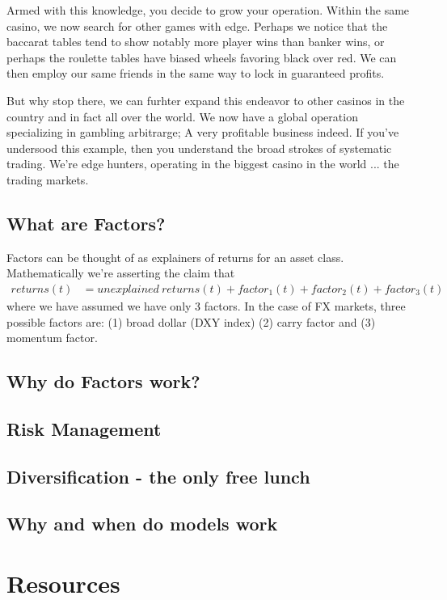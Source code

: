 \documentclass{article}
\begin{document}
Armed with this knowledge, you decide to grow your operation. Within the same casino, we now search for other games with edge. Perhaps we notice that the  baccarat tables tend to show notably more player wins than banker wins, or perhaps the roulette tables have biased wheels favoring black over red. We can then employ our same friends in the same way to lock in guaranteed profits.  

But why stop there, we can furhter expand this endeavor to other casinos in the country and in fact all over the world. We now have a global operation specializing in gambling arbitrarge; A very profitable business indeed.  If you've undersood this example, then you understand the broad strokes of systematic trading. We're edge hunters, operating in the biggest casino in the world ... the trading markets.

 
\subsection{What are Factors?}
Factors can be thought of as explainers of returns for an asset class. Mathematically we're asserting the claim that
\begin{align}
returns(t) & = unexplained\ returns(t)+ factor_1(t) + factor_2(t)  + factor_3(t)
\end{align}
where we have assumed we have only 3 factors. In the case of FX markets, three possible factors are: (1) broad dollar (DXY index) (2) carry factor and (3) momentum factor.


\subsection{Why do Factors work?}

\subsection{Risk Management}

\subsection{Diversification - the only free lunch}

\subsection{Why and when do models work}



\section{Resources}
\end{document}
